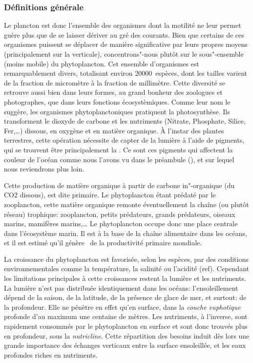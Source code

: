 \subsubsection{Définitions générale}
\label{sec:phyto-def-gen}

Le plancton est donc l'ensemble des organismes dont la motilité ne leur permet guère plus que de se laisser dériver au gré des courants.
Bien que certains de ces organismes puissent se déplacer de manière significative par leurs propres moyens (principalement sur la verticale), concentrons"-nous plutôt sur le sous"-ensemble (moins mobile) du phytoplancton.
Cet ensemble d'organismes est remarquablement divers, totalisant environ \num{20 000}~espèces, dont les tailles varient de la fraction de micromètre à la fraction de millimètre. Cette diversité se retrouve aussi bien dans leurs formes, au grand bonheur des zoologues et photographes, que dans leurs fonctions écosystèmiques.
Comme leur nom le suggère, les organismes phytoplanctoniques pratiquent la photosynthèse.
Ils transforment le dioxyde de carbone et les nutriments (Nitrate, Phosphate, Silice, Fer,\dots) dissous, en oxygène et en matière organique.
À l'instar des plantes terrestres, cette opération nécessite de capter de la lumière à l'aide de pigments, qui se trouvent être principalement la .
Ce sont ces pigments qui affectent la couleur de l'océan comme nous l'avons vu dans le préambule (), et sur lequel nous reviendrons plus loin.

Cette production de matière organique à partir de carbone in"-organique (du CO2 dissous), est dite primaire.
Le phytoplancton étant prédaté par le zooplancton, cette matière organique remonte éventuellement la chaîne (ou plutôt réseau) trophique: zooplancton, petits prédateurs, grands prédateurs, oiseaux marins, mamifères marins,\dots
Le phytoplancton occupe donc une place centrale dans l'écosystème marin.
Il est à la base de la chaîne alimentaire dans les océans, et il est estimé qu'il génère~ de la productivité primaire mondiale.

La croissance du phytoplancton est favorisée, selon les espèces, par des conditions environnementales comme la température, la salinité ou l'acidité (ref).
Cependant les limitations principales à cette croissances restent la lumière et les nutriments.
La lumière n'est pas distribuée identiquement dans les océans: l'ensoleillement dépend de la saison, de la latitude, de la présence de glace de mer, et surtout: de la profondeur.
Elle ne pénètre en effet qu'en surface, dans la \emph{couche euphotique} profonde d'au maximum une centaine de mètres.
Les nutriments, à l'inverse, sont rapidement consommés par le phytoplancton en surface et sont donc trouvés plus en profondeur, sous la \emph{nutricline}.
Cette répartition des besoins induit dès lors une grande importance des échanges verticaux entre la surface ensoleillée, et les eaux profondes riches en nutriments.


